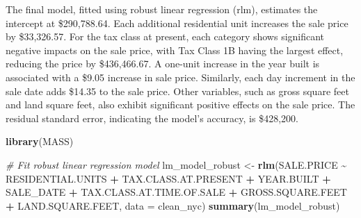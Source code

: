 \documentclass[
]{article}
\newenvironment{Shaded}{\begin{snugshade}}{\end{snugshade}}
\newcommand{\AttributeTok}[1]{\textcolor[rgb]{0.13,0.29,0.53}{#1}}
\newcommand{\CommentTok}[1]{\textcolor[rgb]{0.56,0.35,0.01}{\textit{#1}}}
\newcommand{\FunctionTok}[1]{\textcolor[rgb]{0.13,0.29,0.53}{\textbf{#1}}}
\newcommand{\NormalTok}[1]{#1}
\newcommand{\OtherTok}[1]{\textcolor[rgb]{0.56,0.35,0.01}{#1}}
\newcommand{\SpecialCharTok}[1]{\textcolor[rgb]{0.81,0.36,0.00}{\textbf{#1}}}
\begin{document}
The final model, fitted using robust linear regression (rlm), estimates
the intercept at \$290,788.64. Each additional residential unit
increases the sale price by \$33,326.57. For the tax class at present,
each category shows significant negative impacts on the sale price, with
Tax Class 1B having the largest effect, reducing the price by
\$436,466.67. A one-unit increase in the year built is associated with a
\$9.05 increase in sale price. Similarly, each day increment in the sale
date adds \$14.35 to the sale price. Other variables, such as gross
square feet and land square feet, also exhibit significant positive
effects on the sale price. The residual standard error, indicating the
model's accuracy, is \$428,200.

\begin{Shaded}
\begin{Highlighting}[]
\FunctionTok{library}\NormalTok{(MASS)}

\CommentTok{\# Fit robust linear regression model}
\NormalTok{lm\_model\_robust }\OtherTok{\textless{}{-}} \FunctionTok{rlm}\NormalTok{(SALE.PRICE }\SpecialCharTok{\textasciitilde{}}\NormalTok{ RESIDENTIAL.UNITS }\SpecialCharTok{+}\NormalTok{ TAX.CLASS.AT.PRESENT }\SpecialCharTok{+}\NormalTok{ YEAR.BUILT }\SpecialCharTok{+}\NormalTok{ SALE\_DATE }\SpecialCharTok{+}\NormalTok{ TAX.CLASS.AT.TIME.OF.SALE }\SpecialCharTok{+}\NormalTok{ GROSS.SQUARE.FEET }\SpecialCharTok{+}\NormalTok{ LAND.SQUARE.FEET, }
                       \AttributeTok{data =}\NormalTok{ clean\_nyc)}
\FunctionTok{summary}\NormalTok{(lm\_model\_robust)}
\end{Highlighting}
\end{Shaded}
\end{document}

